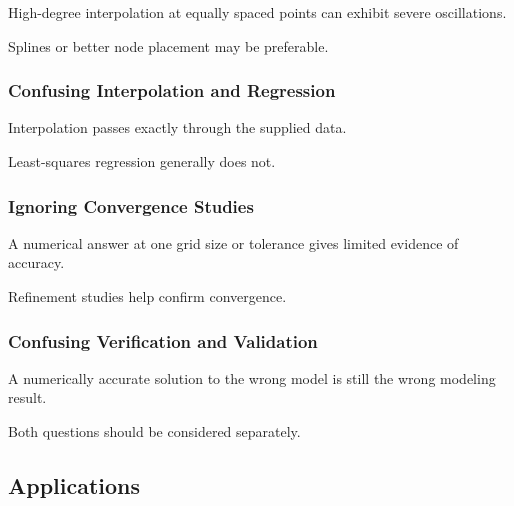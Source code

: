 High-degree interpolation at equally spaced points can exhibit severe
oscillations.

Splines or better node placement may be preferable.

\subsubsection{Confusing Interpolation and Regression}

Interpolation passes exactly through the supplied data.

Least-squares regression generally does not.

\subsubsection{Ignoring Convergence Studies}

A numerical answer at one grid size or tolerance gives limited evidence of
accuracy.

Refinement studies help confirm convergence.

\subsubsection{Confusing Verification and Validation}

A numerically accurate solution to the wrong model is still the wrong
modeling result.

Both questions should be considered separately.

\subsection{Applications}
\label{subsec:numerical-analysis-applications}

